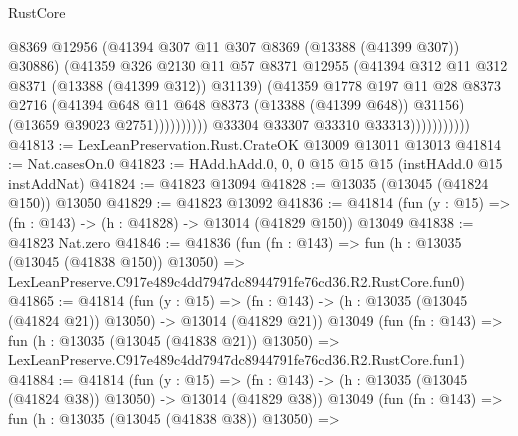 \begin{lexlean}{RustCore}
\begin{coremodule}
                                        @8369
                                        @12956
                                        (@41394 @307 @11 @307 @8369 (@13388 (@41399 @307)) @30886)
                                        (@41359
                                          @326
                                          @2130
                                          @11
                                          @57
                                          @8371
                                          @12955
                                          (@41394 @312 @11 @312 @8371 (@13388 (@41399 @312)) @31139)
                                          (@41359
                                            @1778
                                            @197
                                            @11
                                            @28
                                            @8373
                                            @2716
                                            (@41394
                                              @648
                                              @11
                                              @648
                                              @8373
                                              (@13388 (@41399 @648))
                                              @31156)
                                            (@13659 @39023 @2751))))))))))
                          @33304
                          @33307
                          @33310
                          @33313)))))))))))
@41813 := LexLeanPreservation.Rust.CrateOK @13009 @13011 @13013
@41814 := Nat.casesOn.{0}
@41823 := HAdd.hAdd.{0, 0, 0} @15 @15 @15 (instHAdd.{0} @15 instAddNat)
@41824 := @41823 @13094
@41828 := @13035 (@13045 (@41824 @150)) @13050
@41829 := @41823 @13092
@41836 := @41814 (fun (y : @15) => (fn : @143) -> (h : @41828) -> @13014 (@41829 @150)) @13049
@41838 := @41823 Nat.zero
@41846 := @41836
    (fun (fn : @143) =>
    fun (h : @13035 (@13045 (@41838 @150)) @13050) =>
    LexLeanPreserve.C917e489c4dd7947dc8944791fe76cd36.R2.RustCore.fun0)
@41865 := @41814
    (fun (y : @15) =>
    (fn : @143) -> (h : @13035 (@13045 (@41824 @21)) @13050) -> @13014 (@41829 @21))
    @13049
    (fun (fn : @143) =>
    fun (h : @13035 (@13045 (@41838 @21)) @13050) =>
    LexLeanPreserve.C917e489c4dd7947dc8944791fe76cd36.R2.RustCore.fun1)
@41884 := @41814
    (fun (y : @15) =>
    (fn : @143) -> (h : @13035 (@13045 (@41824 @38)) @13050) -> @13014 (@41829 @38))
    @13049
    (fun (fn : @143) =>
    fun (h : @13035 (@13045 (@41838 @38)) @13050) =>

\end{coremodule}
\end{lexlean}
